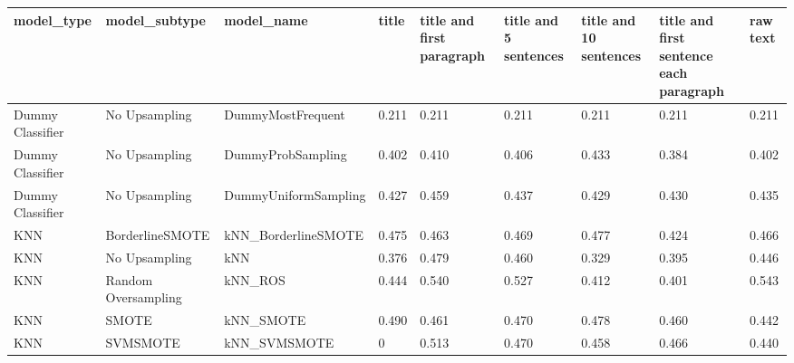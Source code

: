 \begin{tabular}{lllllllll}
\toprule
                  model\_type &       model\_subtype &                                   model\_name & title & title and first paragraph & title and 5 sentences & title and 10 sentences & title and first sentence each paragraph &  raw text \\
\midrule
            Dummy Classifier &       No Upsampling &                            DummyMostFrequent & 0.211 &                     0.211 &                 0.211 &                  0.211 &                                   0.211 &     0.211 \\
            Dummy Classifier &       No Upsampling &                            DummyProbSampling & 0.402 &                     0.410 &                 0.406 &                  0.433 &                                   0.384 &     0.402 \\
            Dummy Classifier &       No Upsampling &                         DummyUniformSampling & 0.427 &                     0.459 &                 0.437 &                  0.429 &                                   0.430 &     0.435 \\
                         KNN &     BorderlineSMOTE &                          kNN\_BorderlineSMOTE & 0.475 &                     0.463 &                 0.469 &                  0.477 &                                   0.424 &     0.466 \\
                         KNN &       No Upsampling &                                          kNN & 0.376 &                     0.479 &                 0.460 &                  0.329 &                                   0.395 &     0.446 \\
                         KNN & Random Oversampling &                                      kNN\_ROS & 0.444 &                     0.540 &                 0.527 &                  0.412 &                                   0.401 &     0.543 \\
                         KNN &               SMOTE &                                    kNN\_SMOTE & 0.490 &                     0.461 &                 0.470 &                  0.478 &                                   0.460 &     0.442 \\
                         KNN &            SVMSMOTE &                                 kNN\_SVMSMOTE &     0 &                     0.513 &                 0.470 &                  0.458 &                                   0.466 &     0.440 \\

\end{tabular}
